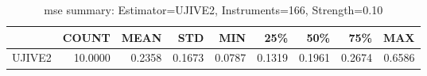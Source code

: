 \begin{table}[ht]
\centering
\caption{mse summary: Estimator=UJIVE2, Instruments=166, Strength=0.10}
\begin{tabular}{lrrrrrrrr}
\toprule
 & COUNT & MEAN & STD & MIN & 25\% & 50\% & 75\% & MAX \\
\midrule
UJIVE2 & 10.0000 & 0.2358 & 0.1673 & 0.0787 & 0.1319 & 0.1961 & 0.2674 & 0.6586 \\
\bottomrule
\end{tabular}
\end{table}
